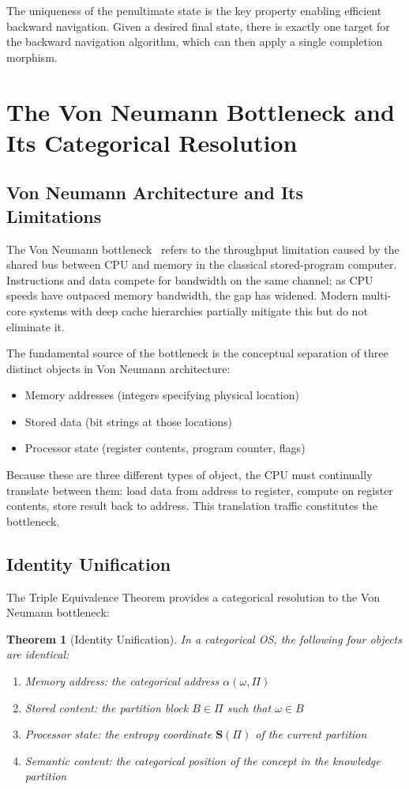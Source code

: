 \documentclass[12pt,twocolumn]{article}
\newtheorem{theorem}{Theorem}[section]
\begin{document}
The uniqueness of the penultimate state is the key property enabling efficient backward navigation. Given a desired final state, there is exactly one target for the backward navigation algorithm, which can then apply a single completion morphism.

\section{The Von Neumann Bottleneck and Its Categorical Resolution}
\label{sec:bottleneck}

\subsection{Von Neumann Architecture and Its Limitations}

The Von Neumann bottleneck~\cite{hennessy2011computer} refers to the throughput limitation caused by the shared bus between CPU and memory in the classical stored-program computer. Instructions and data compete for bandwidth on the same channel; as CPU speeds have outpaced memory bandwidth, the gap has widened. Modern multi-core systems with deep cache hierarchies partially mitigate this but do not eliminate it.

The fundamental source of the bottleneck is the conceptual separation of three distinct objects in Von Neumann architecture:
\begin{itemize}
\item Memory addresses (integers specifying physical location)
\item Stored data (bit strings at those locations)
\item Processor state (register contents, program counter, flags)
\end{itemize}

Because these are three different types of object, the CPU must continually translate between them: load data from address to register, compute on register contents, store result back to address. This translation traffic constitutes the bottleneck.

\subsection{Identity Unification}

The Triple Equivalence Theorem provides a categorical resolution to the Von Neumann bottleneck:

\begin{theorem}[Identity Unification]
\label{thm:unification}
In a categorical OS, the following four objects are identical:
\begin{enumerate}
\item Memory address: the categorical address $\alpha(\omega, \Pi)$
\item Stored content: the partition block $B \in \Pi$ such that $\omega \in B$
\item Processor state: the entropy coordinate $\mathbf{S}(\Pi)$ of the current partition
\item Semantic content: the categorical position of the concept in the knowledge partition
\end{enumerate}
\end{theorem}
\end{document}
